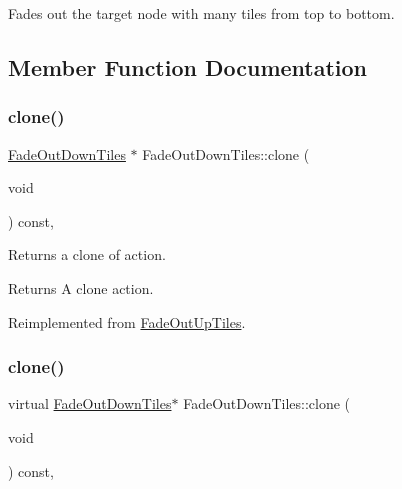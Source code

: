 Fades out the target node with many tiles from top to bottom. 

\subsection{Member Function Documentation}
\mbox{\label{classFadeOutDownTiles_a4a35c11502bbb834d6d4137cb03d2843}} 
\subsubsection{\texorpdfstring{clone()}{clone()}\hspace{0.1cm}{\footnotesize\ttfamily [1/2]}}
{\footnotesize\ttfamily \hyperlink{classFadeOutDownTiles}{Fade\+Out\+Down\+Tiles} $\ast$ Fade\+Out\+Down\+Tiles\+::clone (\begin{DoxyParamCaption}\item[{void}]{ }\end{DoxyParamCaption}) const\hspace{0.3cm}{\ttfamily [override]}, {\ttfamily [virtual]}}

Returns a clone of action.

\begin{DoxyReturn}{Returns}
A clone action. 
\end{DoxyReturn}


Reimplemented from \hyperlink{classFadeOutUpTiles_aa408cee44da1d5e8ebb41063d58a0de9}{Fade\+Out\+Up\+Tiles}.

\mbox{\label{classFadeOutDownTiles_aa7b17d06be4e0d54a401464fd3edcee1}} 
\subsubsection{\texorpdfstring{clone()}{clone()}\hspace{0.1cm}{\footnotesize\ttfamily [2/2]}}
{\footnotesize\ttfamily virtual \hyperlink{classFadeOutDownTiles}{Fade\+Out\+Down\+Tiles}$\ast$ Fade\+Out\+Down\+Tiles\+::clone (\begin{DoxyParamCaption}\item[{void}]{ }\end{DoxyParamCaption}) const\hspace{0.3cm}{\ttfamily [override]}, {\ttfamily [virtual]}}

